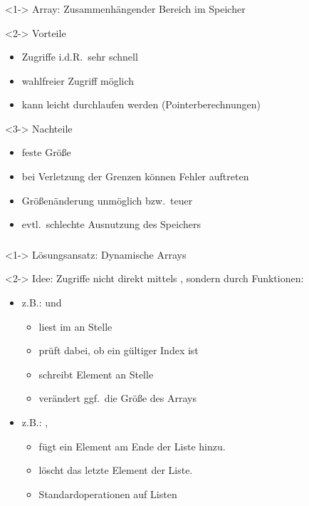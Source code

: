 \begin{frame}
\frametitle{\insertsection}
\begin{block}<1->
{Array: Zusammenhängender Bereich im Speicher}
\end{block}
\vspace{-1em}
\begin{block}<2->
{Vorteile}
\begin{itemize}
	\item Zugriffe i.d.R.\ sehr schnell
	\item wahlfreier Zugriff möglich
	\item kann leicht durchlaufen werden (Pointerberechnungen)
\end{itemize}
\end{block}
\begin{block}<3->
{Nachteile}
\begin{itemize}
	\item feste Größe
	\item bei Verletzung der Grenzen können Fehler auftreten
	\item Größenänderung unmöglich bzw.\ teuer
	\item evtl.\ schlechte Ausnutzung des Speichers
\end{itemize}
\end{block}
\end{frame}

\begin{frame}
\frametitle{\insertsection}
\begin{block}<1->
{Lösungsansatz: Dynamische Arrays}
\end{block}
\vspace{-1em}
\begin{block}<2->
{Idee: Zugriffe nicht direkt mittels \code{\lbrack\rbrack}, sondern durch Funktionen:}
\begin{itemize}
	\item<3-> z.B.:  und 
	\begin{itemize}
		\item {} liest im  an Stelle 
		\item prüft dabei, ob  ein gültiger Index ist
		\item {} schreibt Element  an Stelle 
		\item verändert ggf.\ die Größe des Arrays
	\end{itemize}
	\item<4-> z.B.: , 
	\begin{itemize}
		\item {} fügt ein Element am Ende der Liste hinzu.
		\item {} löscht das letzte Element der Liste.
		\item \alert{Standardoperationen auf Listen}
	\end{itemize}
\end{itemize}
\end{block}
\end{frame}

